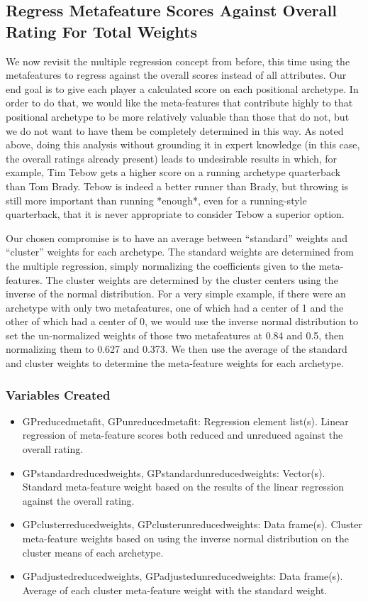 \documentclass[11pt]{article}
\begin{document}
\subsection{Regress Metafeature Scores Against Overall Rating For Total Weights}

We now revisit the multiple regression concept from before, this time using the metafeatures to regress against the overall scores instead of all attributes. Our end goal is to give each player a calculated score on each positional archetype. In order to do that, we would like the meta-features that contribute highly to that positional archetype to be more relatively valuable than those that do not, but we do not want to have them be completely determined in this way. As noted above, doing this analysis without grounding it in expert knowledge (in this case, the overall ratings already present) leads to undesirable results in which, for example, Tim Tebow gets a higher score on a running archetype quarterback than Tom Brady. Tebow is indeed a better runner than Brady, but throwing is still more important than running *enough*, even for a running-style quarterback, that it is never appropriate to consider Tebow a superior option.

Our chosen compromise is to have an average between ``standard'' weights and ``cluster'' weights for each archetype. The standard weights are determined from the multiple regression, simply normalizing the coefficients given to the meta-features. The cluster weights are determined by the cluster centers using the inverse of the normal distribution. For a very simple example, if there were an archetype with only two metafeatures, one of which had a center of 1 and the other of which had a center of 0, we would use the inverse normal distribution to set the un-normalized weights of those two metafeatures at 0.84 and 0.5, then normalizing them to 0.627 and 0.373. We then use the average of the standard and cluster weights to determine the meta-feature weights for each archetype.

\subsubsection{Variables Created}

\begin{itemize}
\item{GPreducedmetafit, GPunreducedmetafit}: Regression element list(s). Linear regression of meta-feature scores both reduced and unreduced against the overall rating.
\item{GPstandardreducedweights, GPstandardunreducedweights}: Vector(s). Standard meta-feature weight based on the results of the linear regression against the overall rating.
\item{GPclusterreducedweights, GPclusterunreducedweights}: Data frame(s). Cluster meta-feature weights based on using the inverse normal distribution on the cluster means of each archetype.
\item{GPadjustedreducedweights, GPadjustedunreducedweights}: Data frame(s). Average of each cluster meta-feature weight with the standard weight.
\end{itemize}
\end{document}
